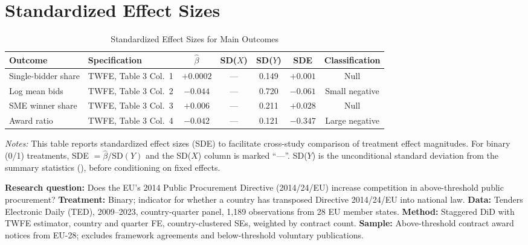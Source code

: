 \documentclass[12pt]{article}
\begin{document}
\section{Standardized Effect Sizes}
\label{sec:sde}

\begin{table}[H]
\centering
\caption{Standardized Effect Sizes for Main Outcomes}
\label{tab:sde}
\begin{adjustbox}{max width=\textwidth}
\begin{tabular}{llccccc}
\toprule
Outcome & Specification & $\hat{\beta}$ & SD($X$) & SD($Y$) & SDE & Classification \\
\midrule
Single-bidder share & TWFE, Table 3 Col.\ 1 & $+0.0002$ & --- & 0.149 & $+0.001$ & Null \\
Log mean bids & TWFE, Table 3 Col.\ 2 & $-0.044$ & --- & 0.720 & $-0.061$ & Small negative \\
SME winner share & TWFE, Table 3 Col.\ 3 & $+0.006$ & --- & 0.211 & $+0.028$ & Null \\
Award ratio & TWFE, Table 3 Col.\ 4 & $-0.042$ & --- & 0.121 & $-0.347$ & Large negative \\
\bottomrule
\end{tabular}
\end{adjustbox}
\par\vspace{0.3em}
{\footnotesize \emph{Notes:} This table reports standardized effect sizes (SDE)
to facilitate cross-study comparison of treatment effect magnitudes.
For binary (0/1) treatments, SDE $= \hat{\beta} / \text{SD}(Y)$ and the SD($X$)
column is marked ``---''.
SD($Y$) is the unconditional standard deviation from the summary
statistics (), before conditioning on fixed effects.

\textbf{Research question:} Does the EU's 2014 Public Procurement Directive (2014/24/EU) increase competition in above-threshold public procurement?
\textbf{Treatment:} Binary; indicator for whether a country has transposed Directive 2014/24/EU into national law.
\textbf{Data:} Tenders Electronic Daily (TED), 2009--2023, country-quarter panel, 1,189 observations from 28 EU member states.
\textbf{Method:} Staggered DiD with TWFE estimator, country and quarter FE, country-clustered SEs, weighted by contract count.
\textbf{Sample:} Above-threshold contract award notices from EU-28; excludes framework agreements and below-threshold voluntary publications.

}
\end{table}
\end{document}
